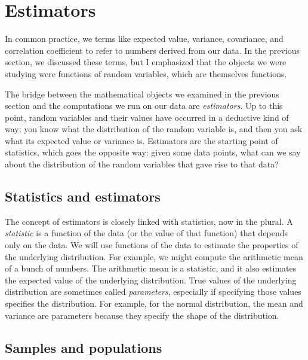 

\chapter{Estimators}

In common practice, we terms like expected value, variance, covariance, and
correlation coefficient to refer to numbers derived from our data. In the
previous section, we discussed these terms, but I emphasized that the objects
we were studying were functions of random variables, which are themselves
functions.

The bridge between the mathematical objects we examined in the previous section
and the computations we run on our data are \emph{estimators}. Up to this
point, random variables and their values have occurred in a deductive kind of
way: you know what the distribution of the random variable is, and then you ask
what its expected value or variance is. Estimators are the starting point of
statistics, which goes the opposite way: given some data points, what can we
say about the distribution of the random variables that gave rise to that data?

\section{Statistics and estimators}

The concept of estimators is closely linked with statistics, now in the plural.
A \emph{statistic} is a function of the data (or the value of that function)
that depends only on the data. We will use functions of the data to estimate
the properties of the underlying distribution. For example, we might compute
the arithmetic mean of a bunch of numbers. The arithmetic mean is a statistic,
and it also estimates the expected value of the underlying distribution. True
values of the underlying distribution are sometimes called \emph{parameters},
especially if specifying those values specifies the distribution. For example,
for the normal distribution, the mean and variance are parameters because they
specify the shape of the distribution.

\section{Samples and populations}

